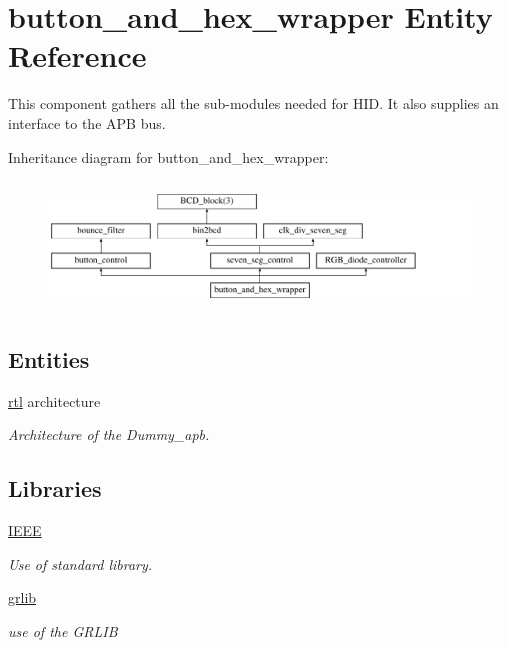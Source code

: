 \hypertarget{classbutton__and__hex__wrapper}{\section{button\-\_\-and\-\_\-hex\-\_\-wrapper Entity Reference}
\label{classbutton__and__hex__wrapper}
}


This component gathers all the sub-\/modules needed for H\-I\-D. It also supplies an interface to the A\-P\-B bus.  


Inheritance diagram for button\-\_\-and\-\_\-hex\-\_\-wrapper\-:\begin{figure}[H]
\begin{center}
\leavevmode
\includegraphics[height=3.435583cm]{classbutton__and__hex__wrapper}
\end{center}
\end{figure}
\subsection*{Entities}
\begin{DoxyCompactItemize}
\item 
\hyperlink{classbutton__and__hex__wrapper_1_1rtl}{rtl} architecture
\begin{DoxyCompactList}\small\item\em Architecture of the Dummy\-\_\-apb. \end{DoxyCompactList}\end{DoxyCompactItemize}
\subsection*{Libraries}
 \begin{DoxyCompactItemize}
\item 
\hypertarget{classbutton__and__hex__wrapper_ae4f03c286607f3181e16b9aa12d0c6d4}{\hyperlink{classbutton__and__hex__wrapper_ae4f03c286607f3181e16b9aa12d0c6d4}{I\-E\-E\-E} }\label{classbutton__and__hex__wrapper_ae4f03c286607f3181e16b9aa12d0c6d4}

\begin{DoxyCompactList}\small\item\em Use of standard library. \end{DoxyCompactList}\item 
\hypertarget{classbutton__and__hex__wrapper_a2306e6b22fb33ca087d2f1b289b10e28}{\hyperlink{classbutton__and__hex__wrapper_a2306e6b22fb33ca087d2f1b289b10e28}{grlib} }\label{classbutton__and__hex__wrapper_a2306e6b22fb33ca087d2f1b289b10e28}

\begin{DoxyCompactList}\small\item\em use of the G\-R\-L\-I\-B \end{DoxyCompactList}\end{DoxyCompactItemize}
